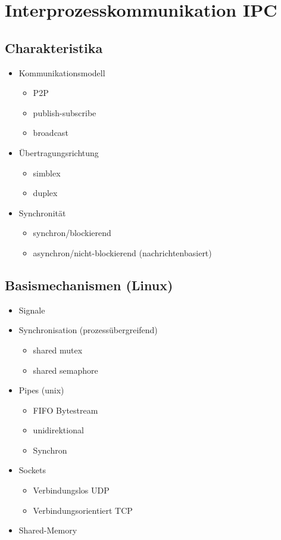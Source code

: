 \section{Interprozesskommunikation IPC}

\subsection{Charakteristika}
\begin{itemize}
    \item Kommunikationsmodell
    \begin{itemize}
        \item P2P
        \item publish-subscribe
        \item broadcast
    \end{itemize}
    \item Übertragungsrichtung
    \begin{itemize}
        \item simblex
        \item duplex
    \end{itemize}
    \item Synchronität
    \begin{itemize}
        \item synchron/blockierend
        \item asynchron/nicht-blockierend (nachrichtenbasiert)
    \end{itemize}
\end{itemize}

\subsection{Basismechanismen (Linux)}
\begin{itemize}
    \item Signale
    \item Synchronisation (prozessübergreifend)
    \begin{itemize}
        \item shared mutex
        \item shared semaphore
    \end{itemize}
    \item Pipes (unix)
    \begin{itemize}
        \item FIFO Bytestream
        \item unidirektional
        \item Synchron
    \end{itemize}
    \item Sockets
    \begin{itemize}
        \item Verbindungslos UDP
        \item Verbindungsorientiert TCP
    \end{itemize}
    \item Shared-Memory
\end{itemize}

